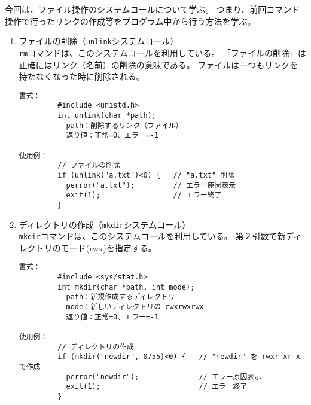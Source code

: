 \documentclass[a4j,dvipdfmx]{jarticle}
\begin{document}
\def\lstlistingname{リスト}


今回は、ファイル操作のシステムコールについて学ぶ。
つまり、前回コマンド操作で行ったリンクの作成等をプログラム中から行う方法を学ぶ。

\begin{enumerate}
\item ファイルの削除（{\tt unlink}システムコール）\\
{\tt rm}コマンドは、このシステムコールを利用している。
「ファイルの削除」は正確にはリンク（名前）の削除の意味である。
ファイルは一つもリンクを持たなくなった時に削除される。
\begin{lstlisting}[numbers=none]
書式：
         #include <unistd.h>
         int unlink(char *path);
           path：削除するリンク（ファイル）
           返り値：正常=0、エラー=-1

使用例：
         // ファイルの削除
         if (unlink("a.txt")<0) {   // "a.txt" 削除
           perror("a.txt");         // エラー原因表示
           exit(1);                 // エラー終了
         }

\end{lstlisting}

\item ディレクトリの作成（{\tt mkdir}システムコール）\\
{\tt mkdir}コマンドは、このシステムコールを利用している。
第２引数で新ディレクトリのモード(rwx)を指定する。
\begin{lstlisting}[numbers=none]
書式：
         #include <sys/stat.h>
         int mkdir(char *path, int mode);
           path：新規作成するディレクトリ
           mode：新しいディレクトリの rwxrwxrwx
           返り値：正常=0、エラー=-1

使用例：
         // ディレクトリの作成
         if (mkdir("newdir", 0755)<0) {   // "newdir" を rwxr-xr-x で作成
           perror("newdir");              // エラー原因表示
           exit(1);                       // エラー終了
         }


\end{lstlisting}
\end{enumerate}
\end{document}

